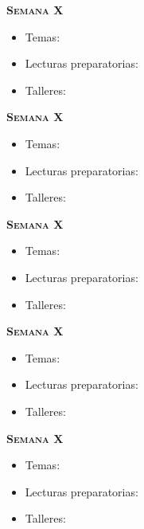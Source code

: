 \documentclass[letterpaper,10pt,onecolumn]{article}
\begin{document}
\noindent\textbf{\textsc{Semana X}}\\[-0.5cm]
\begin{itemize}
\item Temas: \\[-0.6cm]
\item Lecturas preparatorias: \\[-0.6cm]
\item Talleres: \\[-0.6cm]
\end{itemize}

\noindent\textbf{\textsc{Semana X}}\\[-0.5cm]
\begin{itemize}
\item Temas: \\[-0.6cm]
\item Lecturas preparatorias: \\[-0.6cm]
\item Talleres: \\[-0.6cm]
\end{itemize}

\noindent\textbf{\textsc{Semana X}}\\[-0.5cm]
\begin{itemize}
\item Temas: \\[-0.6cm]
\item Lecturas preparatorias: \\[-0.6cm]
\item Talleres: \\[-0.6cm]
\end{itemize}

\noindent\textbf{\textsc{Semana X}}\\[-0.5cm]
\begin{itemize}
\item Temas: \\[-0.6cm]
\item Lecturas preparatorias: \\[-0.6cm]
\item Talleres: \\[-0.6cm]
\end{itemize}

\noindent\textbf{\textsc{Semana X}}\\[-0.5cm]
\begin{itemize}
\item Temas: \\[-0.6cm]
\item Lecturas preparatorias: \\[-0.6cm]
\item Talleres: \\[-0.6cm]
\end{itemize}
\end{document}
